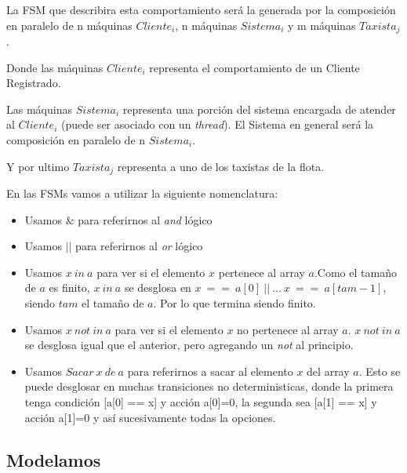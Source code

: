 \documentclass[a4paper, 10pt, twoside]{article}
\begin{document}
La FSM que describira esta comportamiento ser\'a la generada por la composici\'on en paralelo de n m\'aquinas $Cliente_i$, n m\'aquinas $Sistema_i$ y m m\'aquinas $Taxista_j$.

Donde las m\'aquinas $Cliente_i$ representa el comportamiento de un Cliente Registrado.

Las m\'aquinas $Sistema_i$ representa una porci\'on del sistema encargada de atender al $Cliente_i$ (puede ser asociado con un \emph{thread}). El Sistema en general ser\'a la composici\'on en paralelo de n $Sistema_i$.

Y por ultimo $Taxista_j$ representa a uno de los taxistas de la flota.

En las FSMs vamos a utilizar la siguiente nomenclatura:

\begin{itemize}
	\item Usamos $\&$ para referirnos al \emph{and} lógico
	\item Usamos $||$ para referirnos al \emph{or} lógico
	\item Usamos $x\ in\ a$ para ver si el elemento $x$ pertenece al array $a$.Como el tamaño de $a$ es finito, $x\ in\ a$ se desglosa en $x\ ==\ a[0]\ ||\ ... \ x\ ==\ a[tam-1]$, siendo $tam$ el tamaño de $a$. Por lo que termina siendo finito.
	\item Usamos $x\ not\ in\ a$ para ver si el elemento $x$ no pertenece al array $a$. $x\ not\ in\ a$ se desglosa igual que el anterior, pero agregando un \emph{not} al principio. 
	\item Usamos $Sacar\ x\ de\ a$ para referirnos a sacar al elemento $x$ del array $a$. Esto se puede desglosar en muchas transiciones no deterministicas, donde la primera tenga condición [a[0] == x] y acci\'on {a[0]=0}, la segunda sea [a[1] == x] y acci\'on {a[1]=0} y as\'i sucesivamente todas la opciones.
	

\end{itemize}

\subsection{Modelamos}
\end{document}
